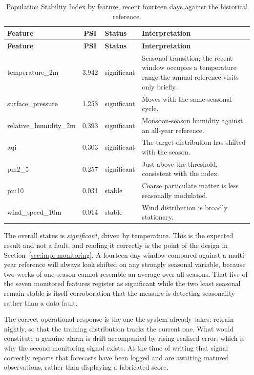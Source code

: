 \begin{xltabular}{\textwidth}{P{4.4cm} C P{2.6cm} Y}
\caption{Population Stability Index by feature, recent fourteen days against the
historical reference.}\label{tab:drift}\\
\toprule
\bfseries Feature & \bfseries PSI & \bfseries Status & \bfseries Interpretation \\
\midrule
\endfirsthead
\toprule
\bfseries Feature & \bfseries PSI & \bfseries Status & \bfseries Interpretation \\
\midrule
\endhead
\bottomrule
\endlastfoot
temperature\_2m & 3.942 & significant & Seasonal transition; the recent window
occupies a temperature range the annual reference visits only briefly. \\
surface\_pressure & 1.253 & significant & Moves with the same seasonal cycle. \\
relative\_humidity\_2m & 0.393 & significant & Monsoon-season humidity against an
all-year reference. \\
aqi & 0.303 & significant & The target distribution has shifted with the season. \\
pm2\_5 & 0.257 & significant & Just above the threshold, consistent with the
index. \\
pm10 & 0.031 & stable & Coarse particulate matter is less seasonally
modulated. \\
wind\_speed\_10m & 0.014 & stable & Wind distribution is broadly stationary. \\
\end{xltabular}

The overall status is \emph{significant}, driven by temperature. This is the
expected result and not a fault, and reading it correctly is the point of the
design in Section~\ref{sec:impl-monitoring}. A fourteen-day window compared
against a multi-year reference will always look shifted on any strongly seasonal
variable, because two weeks of one season cannot resemble an average over all
seasons. That five of the seven monitored features register as significant while
the two least seasonal remain stable is itself corroboration that the measure is
detecting seasonality rather than a data fault.

The correct operational response is the one the system already takes: retrain
nightly, so that the training distribution tracks the current one. What would
constitute a genuine alarm is drift accompanied by rising realised error, which is
why the second monitoring signal exists. At the time of writing that signal
correctly reports that forecasts have been logged and are awaiting matured
observations, rather than displaying a fabricated score.

